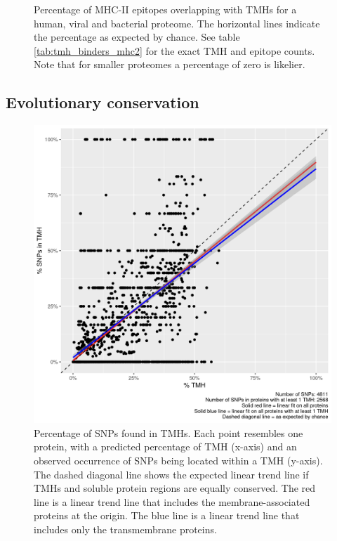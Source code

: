 \begin{figure}[!htbp]
  \caption{
    Percentage of MHC-II epitopes overlapping with TMHs
    for a human, viral and bacterial proteome.
    The horizontal lines indicate the percentage as expected by chance.
    See table \ref{tab:tmh_binders_mhc2} for the exact TMH and epitope counts.
    Note that for smaller proteomes a percentage of zero is likelier.
  }
  \label{fig:2}
\end{figure}

\subsection{Evolutionary conservation}

\begin{figure}[!htbp]
  \includegraphics[width=\textwidth]{ncbi_peregrine_results/fig_f_snps_found_and_expected.png}
  \caption{
    Percentage of SNPs found in TMHs.
    Each point resembles one protein, with a predicted percentage of
    TMH (x-axis) and an observed occurrence of SNPs being located
    within a TMH (y-axis).
    The dashed diagonal line shows the expected linear trend line
    if TMHs and soluble protein regions are equally conserved.
    The red line is a linear trend line that includes the membrane-associated
    proteins at the origin. 
    The blue line is a linear trend line that includes only the
    transmembrane proteins.
  }
  \label{fig:f_snps_found_and_expected}
\end{figure}

